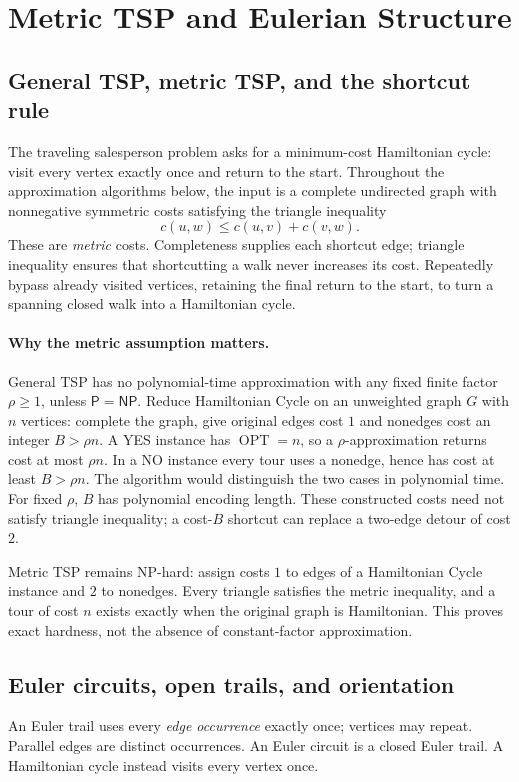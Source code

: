 \documentclass[10pt]{article}
\theoremstyle{definition}
\newcommand{\OPT}{\operatorname{OPT}}
\newcommand{\NP}{\mathsf{NP}}
\newcommand{\PTIME}{\mathsf{P}}
\begin{document}
\clearpage

\section{Metric TSP and Eulerian Structure}\label{tsp:main}

\subsection{General TSP, metric TSP, and the shortcut rule}
The traveling salesperson problem asks for a minimum-cost Hamiltonian
cycle: visit every vertex exactly once and return to the start.  Throughout
the approximation algorithms below, the input is a complete undirected
graph with nonnegative symmetric costs satisfying the triangle inequality
\[
c(u,w)\le c(u,v)+c(v,w).
\]
These are \emph{metric} costs.  Completeness supplies each shortcut edge;
triangle inequality ensures that shortcutting a walk never increases its
cost.  Repeatedly bypass already visited vertices, retaining the final
return to the start, to turn a spanning closed walk into a Hamiltonian cycle.

\paragraph{Why the metric assumption matters.}
General TSP has no polynomial-time approximation with any fixed finite
factor $\rho\ge1$, unless $\PTIME=\NP$.  Reduce Hamiltonian Cycle on an
unweighted graph $G$ with $n$ vertices: complete the graph, give original
edges cost $1$ and nonedges cost an integer $B>\rho n$.  A YES instance has
$\OPT=n$, so a $\rho$-approximation returns cost at most $\rho n$.  In a NO
instance every tour uses a nonedge, hence has cost at least $B>\rho n$.
The algorithm would distinguish the two cases in polynomial time.  For
fixed $\rho$, $B$ has polynomial encoding length.  These constructed costs
need not satisfy triangle inequality; a cost-$B$ shortcut can replace a
two-edge detour of cost $2$.

Metric TSP remains NP-hard: assign costs $1$ to edges of a Hamiltonian Cycle
instance and $2$ to nonedges.  Every triangle satisfies the metric inequality,
and a tour of cost $n$ exists exactly when the original graph is Hamiltonian.
This proves exact hardness, not the absence of constant-factor approximation.

\subsection{Euler circuits, open trails, and orientation}\label{tsp:euler}
An Euler trail uses every \emph{edge occurrence} exactly once; vertices may
repeat.  Parallel edges are distinct occurrences.  An Euler circuit is a
closed Euler trail.  A Hamiltonian cycle instead visits every vertex once.
\end{document}
